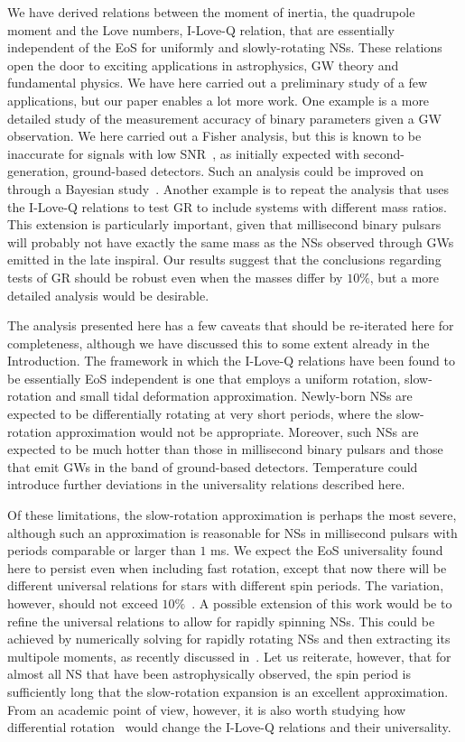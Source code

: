 \documentclass[aps,twocolumn,nofootinbib,showpacs,superscriptaddress,hyperref]{revtex4-1}
\begin{document}
We have derived relations between the moment of inertia, the quadrupole moment and the Love numbers, I-Love-Q relation, that are essentially independent of the EoS for uniformly and slowly-rotating NSs. These relations open the door to exciting applications in astrophysics, GW theory and fundamental physics. We have here carried out a preliminary study of a few applications, but our paper enables a lot more work. One example is a more detailed study of the measurement accuracy of binary parameters given a GW observation. We here carried out a Fisher analysis, but this is known to be inaccurate for signals with low SNR~\cite{vallisneri-fisher}, as initially expected with second-generation, ground-based detectors. Such an analysis could be improved on through a Bayesian study~\cite{vallisneri-fisher,cornish-PPE}. Another example is to repeat the analysis that uses the I-Love-Q relations to test GR to include systems with different mass ratios. This extension is particularly important, given that millisecond binary pulsars will probably not have exactly the same mass as the NSs observed through GWs emitted in the late inspiral. Our results suggest that the conclusions regarding tests of GR should be robust even when the masses differ by $10\%$, but a more detailed analysis would be desirable.

The analysis presented here has a few caveats that should be re-iterated here for completeness, although we have discussed this to some extent already in the Introduction. The framework in which the I-Love-Q relations have been found to be essentially EoS independent is one that employs a uniform rotation, slow-rotation and small tidal deformation approximation. Newly-born NSs are expected to be differentially rotating at very short periods, where the slow-rotation approximation would not be appropriate. Moreover, such NSs are expected to be much hotter than those in millisecond binary pulsars and those that emit GWs in the band of ground-based detectors. Temperature could introduce further deviations in the universality relations described here. 

Of these limitations, the slow-rotation approximation is perhaps the most severe, although such an approximation is reasonable for NSs in millisecond pulsars with periods comparable or larger than $1$ ms. We expect the EoS universality found here to persist even when including fast rotation, except that now there will be different universal relations for stars with different spin periods. The variation, however, should not exceed $10\%$~\cite{berti-stergioulas,berti-white,benhar,pappas-apostolatos}. A possible extension of this work would be to refine the universal relations to allow for rapidly spinning NSs. This could be achieved by numerically solving for rapidly rotating NSs and then extracting its multipole moments, as recently discussed in~\cite{berti-stergioulas,berti-white,benhar,pappas-apostolatos}. Let us reiterate, however, that for almost all NS that have been astrophysically observed, the spin period is sufficiently long that the slow-rotation expansion is an excellent approximation. From an academic point of view, however, it is also worth studying how differential rotation~\cite{chirenti} would change the I-Love-Q relations and their universality.
\end{document}
